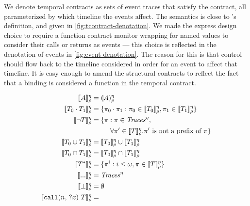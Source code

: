 We denote temporal contracts as sets of event traces that satisfy the contract, all parameterized by which timeline the events affect.
%
The semantics is close to \citeauthor{ianjohnson:dfm:icfp2011}'s definition, and given in \autoref{fig:tcontract-denotation}.
%
We made the express design choice to require a function contract monitor wrapping for named values to consider their calls or returns as events --- this choice is reflected in the denotation of events in \autoref{fig:event-denotation}.
%
The reason for this is that control should flow back to the timeline considered in order for an event to affect that timeline.
%
It is easy enough to amend the structural contracts to reflect the fact that a binding is considered a function in the temporal contract.

\FloatBarrier
\begin{figure}
  \begin{align*}
   \denotetcon{\mevent}{\mtimeline}{\menv} &=
   \denoteevent{\mevent}{\menv}{\mtimeline}
\\
   \denotetcon{\stseq{\mtcon_0}{\mtcon_1}}{\mtimeline}{\menv} &=
   \setbuild{\mtrace_0 \cdot \mtrace_1}{\mtrace_0 \in \denotetcon{\mtcon_0}{\mtimeline}{\menv}, \mtrace_1 \in \denotetcon{\mtcon_1}{\mtimeline}{\menv}}
\\
   \denotetcon{\stnot{\mtcon}}{\mtimeline}{\menv} &=
    \setbuild{\mtrace}{\mtrace \in \Traces^\mtimeline, \\
                      &\phantom{= \{ \mtrace : } \forall \mtrace' \in \denotetcon{\mtcon}{\mtimeline}{\menv}. \mtrace' \text{ is not a prefix of } \mtrace}
\\
   \denotetcon{\stOr{\mtcon_0}{\mtcon_1}}{\mtimeline}{\menv} &=
   \denotetcon{\mtcon_0}{\mtimeline}{\menv} \cup \denotetcon{\mtcon_1}{\mtimeline}{\menv}
\\
   \denotetcon{\stAnd{\mtcon_0}{\mtcon_1}}{\mtimeline}{\menv} &=
   \denotetcon{\mtcon_0}{\mtimeline}{\menv} \cap \denotetcon{\mtcon_1}{\mtimeline}{\menv}
\\
   \denotetcon{\stmany{\mtcon}}{\mtimeline}{\menv} &=
   \setbuild{\mtrace^i}{i \le \omega, \mtrace \in \denotetcon{\mtcon}{\mtimeline}{\menv}}
\\
   \denotetcon{\sddd}{\mtimeline}{\menv} &=
   \Traces^\mtimeline
\\
   \denotetcon{\stfail}{\mtimeline}{\menv} &= \emptyset
\\
   \denotetcon{\stcall{\mname}{\mvar}{\mtcon}}{\mtimeline}{\menv} &=

\end{align*}
\end{figure}
